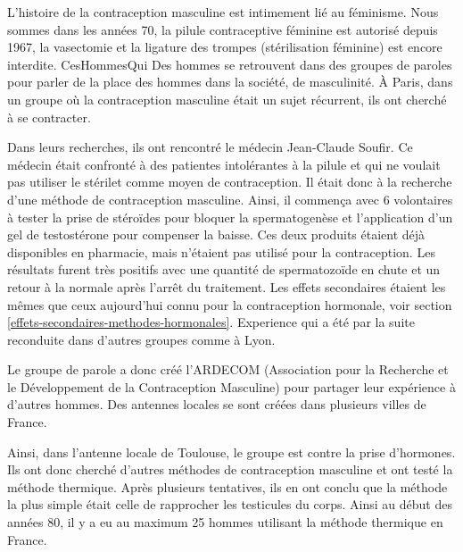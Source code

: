 \documentclass[12pt,a4paper]{report}
\begin{document}
L'histoire de la contraception masculine est intimement lié au féminisme.
Nous sommes dans les années 70, la pilule contraceptive féminine est autorisé depuis 1967, la vasectomie et la ligature des trompes (stérilisation féminine) est encore interdite. \cite{guillaumedaudinContraceptesEnqueteDernier2022}{CesHommesQui}
Des hommes se retrouvent dans des groupes de paroles pour parler de la place des hommes dans la société, de masculinité.
À Paris, dans un groupe où la contraception masculine était un sujet récurrent, ils ont cherché à se contracter.

Dans leurs recherches, ils ont rencontré le médecin Jean-Claude Soufir. \cites{guillaumedaudinContraceptesEnqueteDernier2022}{HistoriqueArdecom}
Ce médecin était confronté à des patientes intolérantes à la pilule et qui ne voulait pas utiliser le stérilet comme moyen de contraception.
Il était donc à la recherche d'une méthode de contraception masculine.
Ainsi, il commença avec 6 volontaires à tester la prise de stéroïdes pour bloquer la spermatogenèse et l'application d'un gel de testostérone pour compenser la baisse.
Ces deux produits étaient déjà disponibles en pharmacie, mais n'étaient pas utilisé pour la contraception. \cites{soufirReversibleInhibitionSperm1983}{bobikaCoeurZobs2022}
Les résultats furent très positifs avec une quantité de spermatozoïde en chute et un retour à la normale après l'arrêt du traitement.
Les effets secondaires étaient les mêmes que ceux aujourd'hui connu pour la contraception hormonale, voir section \ref{effets-secondaires-methodes-hormonales}. \cite{soufirReversibleInhibitionSperm1983}
Experience qui a été par la suite reconduite dans d'autres groupes comme à Lyon. \cite{ContraceptionSeDecline1982}

Le groupe de parole a donc créé l'ARDECOM (Association pour la Recherche et le Développement de la Contraception Masculine) pour partager leur expérience à d'autres hommes.
Des antennes locales se sont créées dans plusieurs villes de France. \cites{HistoriqueArdecom}{guillaumedaudinContraceptesEnqueteDernier2022}

Ainsi, dans l'antenne locale de Toulouse, le groupe est contre la prise d'hormones.
Ils ont donc cherché d'autres méthodes de contraception masculine et ont testé la méthode thermique.
Après plusieurs tentatives, ils en ont conclu que la méthode la plus simple était celle de rapprocher les testicules du corps. \cite{bobikaCoeurZobs2022}
Ainsi au début des années 80, il y a eu au maximum 25 hommes utilisant la méthode thermique en France. \cite{guillaumedaudinContraceptesEnqueteDernier2022}
\end{document}
